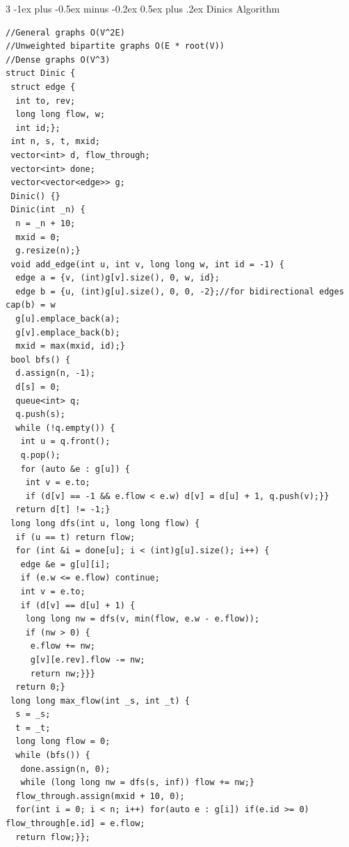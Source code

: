 \documentclass[8pt,a4paper,onesided]{article}
\makeatletter
\renewcommand{\subsection}{\@startsection{subsection}{2}{0mm}
    {-1ex plus -0.5ex minus -0.2ex} %
    {0.5ex plus .2ex}                %
    {\normalfont\large\bfseries}}    %
\makeatother
\begin{document}
\begin{multicols}{3}
\subsection{Dinics Algorithm}
\begin{verbatim}
//General graphs O(V^2E)
//Unweighted bipartite graphs O(E * root(V))
//Dense graphs O(V^3)
struct Dinic {
 struct edge {
  int to, rev;
  long long flow, w;
  int id;};
 int n, s, t, mxid;
 vector<int> d, flow_through;
 vector<int> done;
 vector<vector<edge>> g;
 Dinic() {}
 Dinic(int _n) {
  n = _n + 10;
  mxid = 0;
  g.resize(n);}
 void add_edge(int u, int v, long long w, int id = -1) {
  edge a = {v, (int)g[v].size(), 0, w, id};
  edge b = {u, (int)g[u].size(), 0, 0, -2};//for bidirectional edges cap(b) = w
  g[u].emplace_back(a);
  g[v].emplace_back(b);
  mxid = max(mxid, id);}
 bool bfs() {
  d.assign(n, -1);
  d[s] = 0;
  queue<int> q;
  q.push(s);
  while (!q.empty()) {
   int u = q.front();
   q.pop();
   for (auto &e : g[u]) {
    int v = e.to;
    if (d[v] == -1 && e.flow < e.w) d[v] = d[u] + 1, q.push(v);}}
  return d[t] != -1;}
 long long dfs(int u, long long flow) {
  if (u == t) return flow;
  for (int &i = done[u]; i < (int)g[u].size(); i++) {
   edge &e = g[u][i];
   if (e.w <= e.flow) continue;
   int v = e.to;
   if (d[v] == d[u] + 1) {
    long long nw = dfs(v, min(flow, e.w - e.flow));
    if (nw > 0) {
     e.flow += nw;
     g[v][e.rev].flow -= nw;
     return nw;}}}
  return 0;}
 long long max_flow(int _s, int _t) {
  s = _s;
  t = _t;
  long long flow = 0;
  while (bfs()) {
   done.assign(n, 0);
   while (long long nw = dfs(s, inf)) flow += nw;}
  flow_through.assign(mxid + 10, 0);
  for(int i = 0; i < n; i++) for(auto e : g[i]) if(e.id >= 0) flow_through[e.id] = e.flow;
  return flow;}};
\end{verbatim}

\end{multicols}
\end{document}
